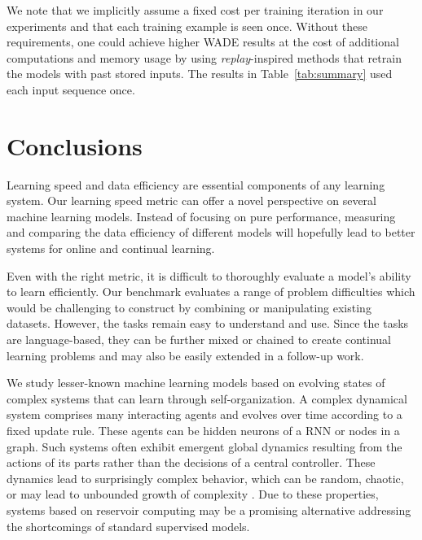 {We note that we implicitly assume a fixed cost per training iteration in our
experiments and that each training example is seen once. Without these
requirements, one could achieve higher WADE results at the cost of additional
computations and memory usage by using \emph{replay}-inspired methods
\cite{hintonUsingFastWeights1987, robinsCatastrophicForgettingNeural1993a,
  gepperthBioInspiredIncrementalLearning2016,
  rebuffiIcarlIncrementalClassifier2017} that retrain the models with past
stored inputs. The results in Table~\ref{tab:summary} used each input sequence
once.

\section{Conclusions}

Learning speed and data efficiency are essential components of any learning
system. Our learning speed metric can offer a novel perspective on several
machine learning models.
Instead of focusing on pure performance, measuring and comparing the data
efficiency of different models will hopefully lead to better systems for online
and continual learning.


Even with the right metric, it is difficult to thoroughly evaluate a model's
ability to learn efficiently. Our benchmark evaluates a range of problem
difficulties which would be challenging to construct by combining or
manipulating existing datasets.
However, the tasks remain easy to understand and use. Since the tasks are
language-based, they can be further mixed or chained to create continual
learning problems and may also be easily extended in a follow-up work.

We study lesser-known machine learning models based on evolving states of
complex systems that can learn through self-organization.
A complex dynamical system comprises many interacting agents and evolves over
time according to a fixed update rule. These agents can be hidden neurons of a
\ac{RNN} or nodes in a graph. Such systems often exhibit emergent global
dynamics resulting from the actions of its parts rather than the decisions of a
central controller. These dynamics lead to surprisingly complex behavior, which
can be random, chaotic, or may lead to unbounded growth of complexity
\cite{boccaraModelingComplexSystems2010}.
Due to these properties, %
systems based on reservoir computing may be a promising alternative addressing
the shortcomings of standard supervised models.

}
